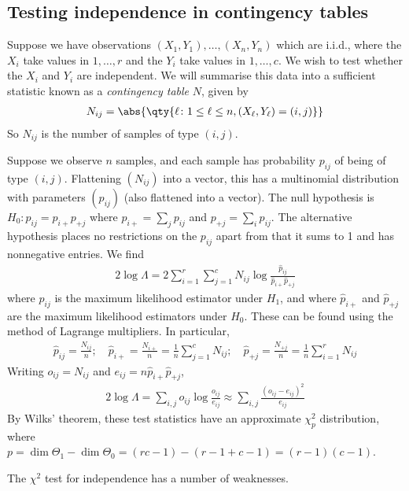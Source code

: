 \subsection{Testing independence in contingency tables}
Suppose we have observations $(X_1, Y_1), \dots, (X_n, Y_n)$ which are i.i.d., where the $X_i$ take values in $1, \dots, r$ and the $Y_i$ take values in $1, \dots, c$.
We wish to test whether the $X_i$ and $Y_i$ are independent.
We will summarise this data into a sufficient statistic known as a \textit{contingency table} $N$, given by
\begin{align*}
	N_{ij} = \abs{ \qty{\ell \colon 1 \leq \ell \leq n, (X_\ell, Y_\ell) = (i,j)} }
\end{align*}
So $N_{ij}$ is the number of samples of type $(i,j)$.
\begin{example}
	Suppose we observe $n$ samples, and each sample has probability $p_{ij}$ of being of type $(i,j)$.
	Flattening $(N_{ij})$ into a vector, this has a multinomial distribution with parameters $(p_{ij})$ (also flattened into a vector).
	The null hypothesis is $H_0 \colon p_{ij} = p_{i+} p_{+j}$ where $p_{i+} = \sum_j p_{ij}$ and $p_{+j} = \sum_i p_{ij}$.
	The alternative hypothesis places no restrictions on the $p_{ij}$ apart from that it sums to 1 and has nonnegative entries.
	We find
	\begin{align*}
		2 \log \Lambda = 2\sum_{i=1}^r \sum_{j=1}^c N_{ij} \log \frac{\hat p_{ij}}{\hat p_{i+} \hat p_{+j}}
	\end{align*}
	where $\hat p_{ij}$ is the maximum likelihood estimator under $H_1$, and where $\hat p_{i+}$ and $\hat p_{+j}$ are the maximum likelihood estimators under $H_0$.
	These can be found using the method of Lagrange multipliers.
	In particular,
	\begin{align*}
		\hat p_{ij} = \frac{N_{ij}}{n};\quad \hat p_{i+} = \frac{N_{i+}}{n} = \frac{1}{n} \sum_{j=1}^c N_{ij};\quad \hat p_{+j} = \frac{N_{+j}}{n} = \frac{1}{n} \sum_{i=1}^r N_{ij}
	\end{align*}
	Writing $o_{ij} = N_{ij}$ and $e_{ij} = n \hat p_{i+} \hat p_{+j}$,
	\begin{align*}
		2 \log \Lambda = \sum_{i,j} o_{ij} \log \frac{o_{ij}}{e_{ij}} \approx \sum_{i,j} \frac{(o_{ij} - e_{ij})^2}{e_{ij}}
	\end{align*}
	By Wilks' theorem, these test statistics have an approximate $\chi^2_p$ distribution, where $p = \dim \Theta_1 - \dim \Theta_0 = (rc-1) - (r-1 + c-1) = (r-1)(c-1)$.
\end{example}
The $\chi^2$ test for independence has a number of weaknesses.
